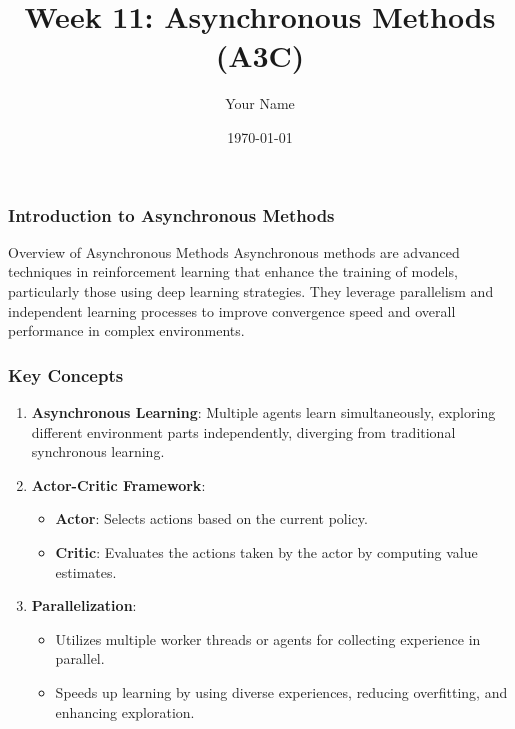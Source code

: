 \documentclass{beamer}
\title{Week 11: Asynchronous Methods (A3C)}
\author{Your Name}
\institute{Your Institution}
\date{\today}
\begin{document}
\frame{\titlepage}

\begin{frame}[fragile]
    \frametitle{Introduction to Asynchronous Methods}
    \begin{block}{Overview of Asynchronous Methods}
        Asynchronous methods are advanced techniques in reinforcement learning that enhance the training of models, particularly those using deep learning strategies. They leverage parallelism and independent learning processes to improve convergence speed and overall performance in complex environments.
    \end{block}
\end{frame}

\begin{frame}[fragile]
    \frametitle{Key Concepts}
    \begin{enumerate}
        \item \textbf{Asynchronous Learning}: Multiple agents learn simultaneously, exploring different environment parts independently, diverging from traditional synchronous learning.
        
        \item \textbf{Actor-Critic Framework}: 
            \begin{itemize}
                \item \textbf{Actor}: Selects actions based on the current policy.
                \item \textbf{Critic}: Evaluates the actions taken by the actor by computing value estimates.
            \end{itemize}
        
        \item \textbf{Parallelization}: 
            \begin{itemize}
                \item Utilizes multiple worker threads or agents for collecting experience in parallel.
                \item Speeds up learning by using diverse experiences, reducing overfitting, and enhancing exploration.
            \end{itemize}
    \end{enumerate}
\end{frame}
\end{document}
